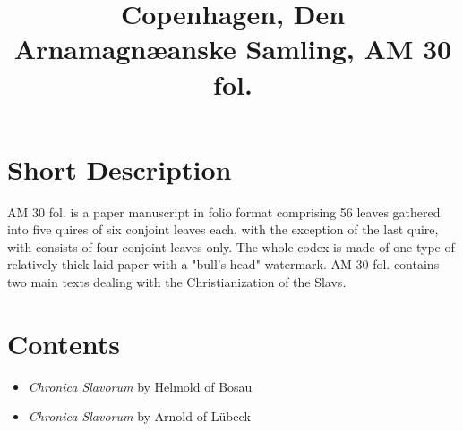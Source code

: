 \documentclass{article}
\begin{document}
\title{Copenhagen, Den Arnamagnæanske Samling, AM 30 fol.}
\maketitle
\section*{Short Description}
AM 30 fol. is a paper manuscript in folio format comprising 56 leaves gathered into five quires of six conjoint leaves each, with the exception of the last quire, with consists of four conjoint leaves only. The whole codex is made of one type of relatively thick laid paper with a "bull's head" watermark.  AM 30 fol. contains two main texts dealing with the Christianization of the Slavs.
\section*{Contents}
\begin{itemize}
	\item  \emph{Chronica Slavorum} by Helmold of Bosau
	\item  \emph{Chronica Slavorum} by Arnold of Lübeck
\end{itemize}
\end{document}
